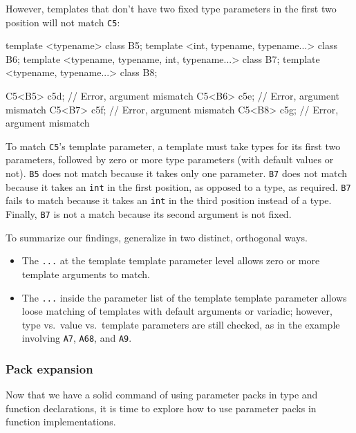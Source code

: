 \noindent However, templates that don't have two fixed type parameters in the
first two position will not match \lstinline!C5!:

\begin{emcppslisting}
template <typename> class B5;
template <int, typename, typename...> class B6;
template <typename, typename, int, typename...> class B7;
template <typename, typename...> class B8;

C5<B5> c5d;  // Error, argument mismatch
C5<B6> c5e;  // Error, argument mismatch
C5<B7> c5f;  // Error, argument mismatch
C5<B8> c5g;  // Error, argument mismatch
\end{emcppslisting}
    

\noindent To match \lstinline!C5!'s template parameter, a template must take types
for its first two parameters, followed by zero or more type parameters
(with default values or not). \lstinline!B5! does not match because it
takes only one parameter. \lstinline!B7! does not match because it takes an
\lstinline!int! in the first position, as opposed to a type, as required.
\lstinline!B7! fails to match because it takes an \lstinline!int! in the third
position instead of a type. Finally, \lstinline!B7! is not a match because
its second argument is not fixed.

To summarize our findings,  generalize
 in two distinct, orthogonal ways.
\begin{itemize}
\item{The \lstinline!...! at the template template parameter level allows zero or more template arguments to match.}
\item{The \lstinline!...! inside the parameter list of the template template parameter allows loose matching of templates with default arguments or variadic; however, type vs. value vs. template parameters are still checked, as in the example involving \lstinline!A7!, \lstinline!A68!, and \lstinline!A9!.}
\end{itemize}

\subsubsection[Pack expansion]{Pack expansion}\label{pack-expansion}

Now that we have a solid command of using parameter packs in type and
function declarations, it is time to explore how to use parameter packs
in function implementations.

